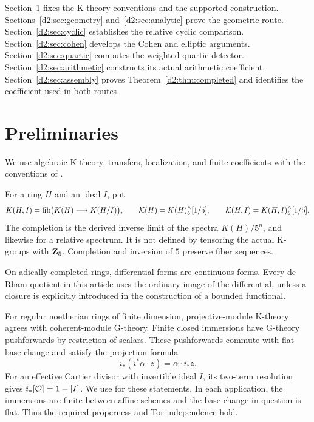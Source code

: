 Section~\ref{d2:sec:preliminaries} fixes the K-theory conventions and the
supported construction. Sections~\ref{d2:sec:geometry}
and~\ref{d2:sec:analytic} prove the geometric route.
Section~\ref{d2:sec:cyclic} establishes the relative cyclic comparison.
Section~\ref{d2:sec:cohen} develops the Cohen and elliptic arguments.
Section~\ref{d2:sec:quartic} computes the weighted quartic detector.
Section~\ref{d2:sec:arithmetic} constructs its actual arithmetic coefficient.
Section~\ref{d2:sec:assembly} proves Theorem~\ref{d2:thm:completed} and identifies
the coefficient used in both routes.

\section{Preliminaries}\label{d2:sec:preliminaries}

We use algebraic K-theory, transfers, localization, and finite
coefficients with the conventions of
\cite[Chapters~IV and~V]{Weibel}.

\begin{notation}\label{d2:notation:completion}
For a ring \(H\) and an ideal \(I\), put
\[
 K(H,I)=\mathrm{fib}\bigl(K(H)\longrightarrow K(H/I)\bigr),
 \qquad
 \mathcal K(H)=K(H)^\wedge_5[1/5],
 \qquad
 \mathcal K(H,I)=K(H,I)^\wedge_5[1/5].
\]
The completion is the derived inverse limit of the spectra
\(K(H)/5^n\), and likewise for a relative spectrum.
It is not defined by tensoring the actual K-groups with \(\mathbf{Z} _5\).
Completion and inversion of \(5\) preserve fiber sequences.

On adically completed rings, differential forms are continuous forms.
Every de Rham quotient in this article uses the ordinary image of the
differential, unless a closure is explicitly introduced in the
construction of a bounded functional.
\end{notation}

For regular noetherian rings of finite dimension, projective-module
K-theory agrees with coherent-module G-theory. Finite closed immersions
have G-theory pushforwards by restriction of scalars. These pushforwards commute with flat base change and satisfy the projection formula
\[
 i_*(i^*\alpha\cdot z)=\alpha\cdot i_*z.
\]
For an effective Cartier divisor with invertible ideal \(I\), its
two-term resolution gives \(i_*[\mathcal O]=1-[I]\).
We use \cite[V.3.3, V.3.3.2, V.3.7.2, V.3.12]{Weibel}
for these statements. In each application, the immersions are finite
between affine schemes and the base change in question is flat.
Thus the required properness and Tor-independence hold.

